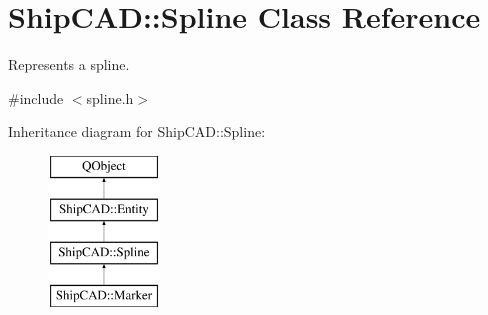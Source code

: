 \hypertarget{classShipCAD_1_1Spline}{\section{Ship\-C\-A\-D\-:\-:Spline Class Reference}
\label{classShipCAD_1_1Spline}
}


Represents a spline.  




{\ttfamily \#include $<$spline.\-h$>$}

Inheritance diagram for Ship\-C\-A\-D\-:\-:Spline\-:\begin{figure}[H]
\begin{center}
\leavevmode
\includegraphics[height=4.000000cm]{classShipCAD_1_1Spline}
\end{center}
\end{figure}
